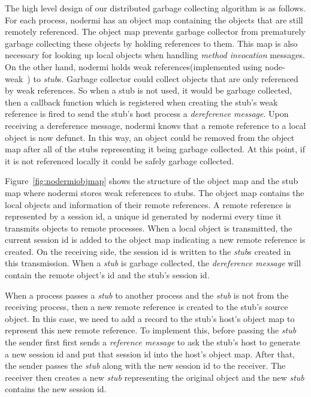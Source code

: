 
The high level design of our distributed garbage collecting
algorithm is as follows.
For each process, nodermi has an object map containing the objects
that are still remotely referenced.
The object map prevents garbage collector from prematurely garbage collecting
these objects by holding references to them.
This map is also necessary for looking up local objects
when handling \emph{method invocation} messages.
On the other hand, nodermi holds weak references(implemented using node-weak~\cite{nodeweak})
to \emph{stub}s.
Garbage collector could collect objects that are only
referenced by weak references.
So when a stub is not used, it would be garbage collected,
then a callback function which is registered when creating
the stub's weak reference is fired to
send the stub's host process a \emph{dereference message}.
Upon receiving a dereference message,
nodermi knows that a remote reference to a local object
is now defunct.
In this way, an object could be removed from the object map after
all of the stubs representing it being garbage collected.
At this point, if it is not referenced locally it could
be safely garbage collected.


\nodermiobjmapfig{}

Figure~\ref{fig:nodermiobjmap} shows the structure of
the object map and the stub map
where nodermi stores weak references to stubs.
The object map contains the local objects and information of
their remote references.
A remote reference is represented by a session id,
a unique id generated by nodermi every time it transmits objects
to remote processes.
When a local object is transmitted, the current session id is added to
the object map indicating a new remote reference is created.
On the receiving side, the session id is written to
the \emph{stub}s created in this transmission.
When a \emph{stub} is garbage collected,
the \emph{dereference message} will contain
the remote object's id and the stub's session id.


When a process passes a \emph{stub} to another process
and the \emph{stub} is not from the receiving process,
then a new remote reference is created to the stub's source object.
In this case, 
we need to add a record to the stub's host's object map to represent
this new remote reference.
To implement this,
before passing the \emph{stub}
the sender first first sends a \emph{reference message} to
ask the stub's host to generate a new session id
and put that session id into the host's object map.
After that,
the sender passes the \emph{stub} along with the new session id
to the receiver.
The receiver then creates a new \emph{stub} 
representing the original object and the new \emph{stub}
contains the new session id.

